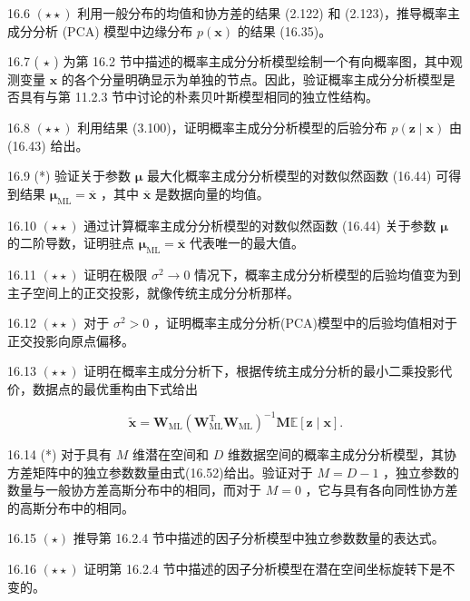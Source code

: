 \documentclass[10pt]{article}
\begin{document}
16.6 \(\left( {\star  \star  }\right)\) 利用一般分布的均值和协方差的结果 (2.122) 和 (2.123)，推导概率主成分分析 (PCA) 模型中边缘分布 \(p\left( \mathbf{x}\right)\) 的结果 (16.35)。

16.7 ( \(\star\) ) 为第 16.2 节中描述的概率主成分分析模型绘制一个有向概率图，其中观测变量 \(\mathbf{x}\) 的各个分量明确显示为单独的节点。因此，验证概率主成分分析模型是否具有与第 11.2.3 节中讨论的朴素贝叶斯模型相同的独立性结构。

16.8 \(\left( {\star  \star  }\right)\) 利用结果 (3.100)，证明概率主成分分析模型的后验分布 \(p\left( {\mathbf{z} \mid  \mathbf{x}}\right)\) 由 (16.43) 给出。

16.9 (*) 验证关于参数 \(\mathbf{\mu }\) 最大化概率主成分分析模型的对数似然函数 (16.44) 可得到结果 \({\mathbf{\mu }}_{\mathrm{{ML}}} = \overline{\mathbf{x}}\) ，其中 \(\overline{\mathbf{x}}\) 是数据向量的均值。

16.10 \(\left( {\star  \star  }\right)\) 通过计算概率主成分分析模型的对数似然函数 (16.44) 关于参数 \(\mathbf{\mu }\) 的二阶导数，证明驻点 \({\mathbf{\mu }}_{\mathrm{{ML}}} = \overline{\mathbf{x}}\) 代表唯一的最大值。

16.11 \(\left( {\star  \star  }\right)\) 证明在极限 \({\sigma }^{2} \rightarrow  0\) 情况下，概率主成分分析模型的后验均值变为到主子空间上的正交投影，就像传统主成分分析那样。

16.12 \(\left( {\star  \star  }\right)\) 对于 \({\sigma }^{2} > 0\) ，证明概率主成分分析(PCA)模型中的后验均值相对于正交投影向原点偏移。

16.13 \(\left( {\star  \star  }\right)\) 证明在概率主成分分析下，根据传统主成分分析的最小二乘投影代价，数据点的最优重构由下式给出

\[
\widetilde{\mathbf{x}} = {\mathbf{W}}_{\mathrm{{ML}}}{\left( {\mathbf{W}}_{\mathrm{{ML}}}^{\mathrm{T}}{\mathbf{W}}_{\mathrm{{ML}}}\right) }^{-1}\mathbf{M}\mathbb{E}\left\lbrack  {\mathbf{z} \mid  \mathbf{x}}\right\rbrack  . \tag{16.88}
\]

16.14 (*) 对于具有 \(M\) 维潜在空间和 \(D\) 维数据空间的概率主成分分析模型，其协方差矩阵中的独立参数数量由式(16.52)给出。验证对于 \(M = D - 1\) ，独立参数的数量与一般协方差高斯分布中的相同，而对于 \(M = 0\) ，它与具有各向同性协方差的高斯分布中的相同。

16.15 \(\left( \star \right)\) 推导第 16.2.4 节中描述的因子分析模型中独立参数数量的表达式。

16.16 \(\left( {\star  \star  }\right)\) 证明第 16.2.4 节中描述的因子分析模型在潜在空间坐标旋转下是不变的。
\end{document}
